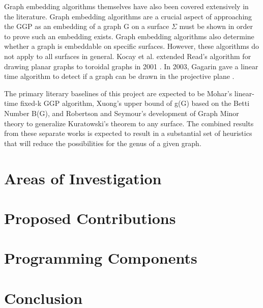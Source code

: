 \documentclass[12pt,conference]{IEEEtran}
\begin{document}
Graph embedding algorithms themselves have also been covered extensively in the literature. Graph embedding algorithms are a crucial aspect of approaching the GGP as an embedding of a graph G on a surface $\Sigma$ must be shown in order to prove such an embedding exists. Graph embedding algorithms also determine whether a graph is embeddable on specific surfaces. However, these algorithms do not apply to all surfaces in general. Kocay et al. extended Read's algorithm for drawing planar graphs to toroidal graphs in 2001 \cite{kocay}. In 2003, Gagarin gave a linear time algorithm to detect if a graph can be drawn in the projective plane \cite{gagarin}. 

The primary literary baselines of this project are expected to be Mohar's linear-time fixed-k GGP algorithm, Xuong's upper bound of g(G) based on the Betti Number B(G), and Robertson and Seymour's development of Graph Minor theory to generalize Kuratowski's theorem to any surface. The combined results from these separate works is expected to result in a substantial set of heuristics that will reduce the possibilities for the genus of a given graph.

\section{Areas of Investigation}

\section{Proposed Contributions}

\section{Programming Components}

\section{Conclusion}

\begin{thebibliography}{1}
\end{thebibliography}
\end{document}
